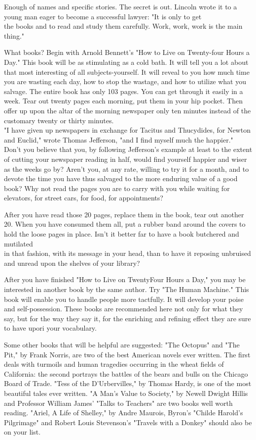 \documentclass[10pt]{article}
\begin{document}
Enough of names and specific stories. The secret is out. Lincoln wrote it to a young man eager to become a successful lawyer: "It is only to get\\
the books and to read and study them carefully. Work, work, work is the main thing."

What books? Begin with Arnold Bennett's "How to Live on Twenty-four Hours a Day." This book will be as stimulating as a cold bath. It will tell you a lot about that most interesting of all subjects-yourself. It will reveal to you how much time you are wasting each day, how to stop the wastage, and how to utilize what you salvage. The entire book has only 103 pages. You can get through it easily in a week. Tear out twenty pages each morning, put them in your hip pocket. Then offer up upon the altar of the morning newspaper only ten minutes instead of the customary twenty or thirty minutes.\\
"I have given up newspapers in exchange for Tacitus and Thucydides, for Newton and Euclid," wrote Thomas Jefferson, "and I find myself much the happier." Don't you believe that you, by following Jefferson's example at least to the extent of cutting your newspaper reading in half, would find yourself happier and wiser as the weeks go by? Aren't you, at any rate, willing to try it for a month, and to devote the time you have thus salvaged to the more enduring value of a good book? Why not read the pages you are to carry with you while waiting for elevators, for street cars, for food, for appointments?

After you have read those 20 pages, replace them in the book, tear out another 20. When you have consumed them all, put a rubber band around the covers to hold the loose pages in place. Isn't it better far to have a book butchered and mutilated\\
in that fashion, with its message in your head, than to have it reposing unbruised and unread upon the shelves of your library?

After you have finished "How to Live on TwentyFour Hours a Day," you may be interested in another book by the same author. Try "The Human Machine." This book will enable you to handle people more tactfully. It will develop your poise and self-possession. These books are recommended here not only for what they say, but for the way they say it, for the enriching and refining effect they are sure to have upori your vocabulary.

Some other books that will be helpful are suggested: "The Octopus" and "The Pit," by Frank Norris, are two of the best American novels ever written. The first deals with turmoils and human tragedies occurring in the wheat fields of California: the second portrays the battles of the bears and bulls on the Chicago Board of Trade. "Tess of the D'Urbervilles," by Thomas Hardy, is one of the most beautiful tales ever written. "A Man's Value to Society," by Newell Dwight Hillis and Professor William James' "Talks to Teachers" are two books well worth reading. "Ariel, A Life of Shelley," by Andre Maurois, Byron's "Childe Harold's Pilgrimage" and Robert Louis Stevenson's "Travels with a Donkey" should also be on your list.
\end{document}
